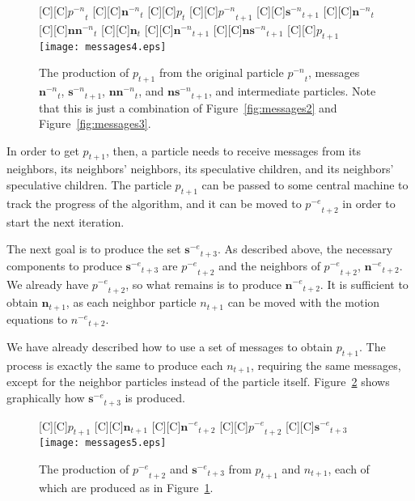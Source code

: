 \documentclass[journal,letterpaper]{IEEEtran}
\newcommand{\fig}[1]{Figure~\ref{fig:#1}}
\providecommand{\noeval}[1]{\ensuremath{#1^{-e}}}
\providecommand{\nonbest}[1]{\ensuremath{#1^{-n}}}
\providecommand{\p}{\ensuremath{p}}
\providecommand{\sset}{\ensuremath{\mathbf{s}}}
\providecommand{\nsset}{\ensuremath{\mathbf{ns}}}
\providecommand{\n}{\ensuremath{n}}
\providecommand{\nset}{\ensuremath{\mathbf{n}}}
\providecommand{\nnset}{\ensuremath{\mathbf{nn}}}
\begin{document}
\begin{figure}
  \centering
  [C][C]{$\nonbest{\p}_{t}$}
  [C][C]{$\nonbest{\nset}_{t}$}
  [C][C]{$\p_{t}$}
  [C][C]{$\nonbest{\p}_{t+1}$}
  [C][C]{$\nonbest{\sset}_{t+1}$}
  [C][C]{$\nonbest{\nset}_{t}$}
  [C][C]{$\nonbest{\nnset}_{t}$}
  [C][C]{$\nset_{t}$}
  [C][C]{$\nonbest{\nset}_{t+1}$}
  [C][C]{$\nonbest{\nsset}_{t+1}$}
  [C][C]{$\p_{t+1}$}
  \texttt{[image: messages4.eps]}
  \caption{The production of $\p_{t+1}$ from the original particle 
  $\nonbest{\p}_{t}$, messages $\nonbest{\nset}_{t}$, $\nonbest{\sset}_{t+1}$,
  $\nonbest{\nnset}_{t}$, and $\nonbest{\nsset}_{t+1}$, and intermediate
  particles.  Note that this is just a combination of \fig{messages2} and
  \fig{messages3}.}
  \label{fig:messages4}
\end{figure}

In order to get $\p_{t+1}$, then, a particle needs to receive messages from its
neighbors, its neighbors' neighbors, its speculative children, and its
neighbors' speculative children.  The particle $\p_{t+1}$ can be passed to some
central machine to track the progress of the algorithm, and it can be moved to
$\noeval{\p}_{t+2}$ in order to start the next iteration.

The next goal is to produce the set $\noeval{\sset}_{t+3}$.  As described
above, the necessary components to produce $\noeval{\sset}_{t+3}$ are
$\noeval{\p}_{t+2}$ and the neighbors of $\noeval{\p}_{t+2}$,
$\noeval{\nset}_{t+2}$.  We already have $\noeval{\p}_{t+2}$, so what remains
is to produce $\noeval{\nset}_{t+2}$.  It is sufficient to obtain
$\nset_{t+1}$, as each neighbor particle $\n_{t+1}$ can be moved with the
motion equations to $\noeval{\n}_{t+2}$.

We have already described how to use a set of messages to obtain $\p_{t+1}$.
The process is exactly the same to produce each $\n_{t+1}$, requiring the same
messages, except for the neighbor particles instead of the particle itself.  
\fig{messages5} shows graphically how $\noeval{\sset}_{t+3}$ is produced.

\begin{figure}
  \centering
  [C][C]{$\p_{t+1}$}
  [C][C]{$\nset_{t+1}$}
  [C][C]{$\noeval{\nset}_{t+2}$}
  [C][C]{$\noeval{\p}_{t+2}$}
  [C][C]{$\noeval{\sset}_{t+3}$}
  \texttt{[image: messages5.eps]}
  \caption{The production of $\noeval{\p}_{t+2}$ and $\noeval{\sset}_{t+3}$
  from $\p_{t+1}$ and $\n_{t+1}$, each of which are produced as in
  \fig{messages4}.}
  \label{fig:messages5}
\end{figure}
\end{document}
